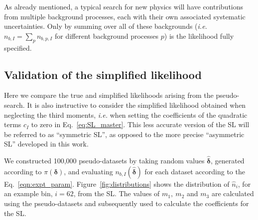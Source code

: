 \documentclass[11pt]{article}
\def\ie{{\it i.e.}}
\begin{document}
As already mentioned, a typical search for new physics will have contributions from multiple background processes, each with their own associated systematic uncertainties.
Only by summing over all of these backgrounds (\ie\ $n_{b,I}=\sum_{p}n_{b,p,I}$ for different background processes $p$) is the likelihood fully specified.









\subsection{Validation of the simplified likelihood}


Here we compare the true and simplified likelihoods arising from the pseudo-search. It is also instructive to consider the simplified likelihood obtained when neglecting the third moments, \textit{i.e.} when setting the coefficients of the quadratic terms $c_I$ to zero in Eq.~\eqref{eq:SL_master}. This less accurate version of the SL will be  referred to as ``symmetric SL'', as opposed to the more precise ``asymmetric SL'' developed in this work. 


We constructed 100,000 pseudo-datasets by taking random values ${\hat{\bm{\delta}}}$, generated according to $\pi(\bm{\delta})$, and evaluating
$n_{b,I}(\hat{\bm{\delta}})$ for each dataset according to the Eq.~\eqref{eqn:expt_param}. Figure~\ref{fig:distributions} shows the distribution of $\hat{n}_{i}$, for an example bin, $i=62$,
from the SL. The values of $m_{1},~m_{2}$ and $m_{3}$ are calculated using the pseudo-datasets and subsequently used to calculate the coefficients for the SL.

\end{document}
